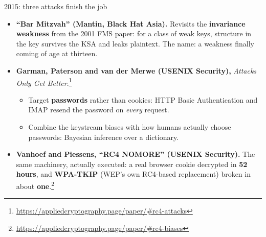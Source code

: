 \ifdefined\PRESENTATION\else\PassOptionsToClass{handout}{beamer}\fi\documentclass[aspectratio=169, lualatex]{beamer}
\begin{document}
\begin{frame}{2015: three attacks finish the job}
	\begin{itemize}[<+->]
		\item \textbf{``Bar Mitzvah'' (Mantin, Black Hat Asia).} Revisits the \textbf{invariance weakness} from the 2001 FMS paper: for a class of weak keys, structure in the key survives the KSA and leaks plaintext. The name: a weakness finally coming of age at thirteen.
		\item \textbf{Garman, Paterson and van der Merwe (USENIX Security),} \textit{Attacks Only Get Better}.\footnote{\url{https://appliedcryptography.page/paper/\#rc4-attacks}}
		      \begin{itemize}
			      \item Target \textbf{passwords} rather than cookies: HTTP Basic Authentication and IMAP resend the password on \emph{every} request.
			      \item Combine the keystream biases with how humans actually choose passwords: Bayesian inference over a dictionary.
		      \end{itemize}
		\item \textbf{Vanhoef and Piessens, ``RC4 NOMORE'' (USENIX Security).} The same machinery, actually executed: a real browser cookie decrypted in \textbf{52 hours}, and \textbf{WPA-TKIP} (WEP's own RC4-based replacement) broken in about \textbf{one}.\footnote{\url{https://appliedcryptography.page/paper/\#rc4-biases}}
	\end{itemize}
\end{frame}
\end{document}
